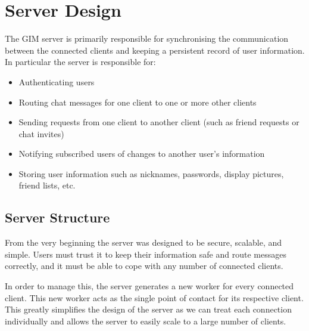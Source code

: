 \section{Server Design}

The GIM server is primarily responsible for synchronising the communication between the connected clients and keeping a persistent record of user information. In particular the server is responsible for:

\begin{itemize}
    \item{Authenticating users}
    \item{Routing chat messages for one client to one or more other clients}
    \item{Sending requests from one client to another client (such as friend requests or chat invites)}
    \item{Notifying subscribed users of changes to another user's information}
    \item{Storing user information such as nicknames, passwords, display pictures, friend lists, etc.}
\end{itemize}


\subsection{Server Structure}

From the very beginning the server was designed to be secure, scalable, and simple. Users must trust it to keep their information safe and route messages correctly, and it must be able to cope with any number of connected clients.

In order to manage this, the server generates a new worker for every connected client. This new worker acts as the single point of contact for its respective client. This greatly simplifies the design of the server as we can treat each connection individually and allows the server to easily scale to a large number of clients.

